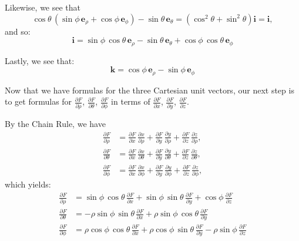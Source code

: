 {Likewise, we see that
\[
 \cos\theta\,(\sin\phi\,\textbf{e}_{\rho} + \cos\phi\,\textbf{e}_{\phi}) - \sin\theta\,\textbf{e}_{\theta} =
  (\cos^2 \theta + \sin^2 \theta)\textbf{i} = \textbf{i} ,
\]
and so:
\begin{equation}\label{i_sphere}
 \textbf{i} = \sin\phi\,\cos\theta\,\textbf{e}_{\rho} - \sin\theta\,\textbf{e}_{\theta} + \cos\phi\,\cos\theta\,\textbf{e}_{\phi}
\end{equation}

Lastly, we see that:
\begin{equation}\label{k_sphere}
 \textbf{k} = \cos\phi\,\textbf{e}_{\rho} - \sin\phi\,\textbf{e}_{\phi}
\end{equation}

Now that we have formulas for the three Cartesian unit vectors, our next step is to get formulas for $\frac{\partial F}{\partial \rho}$, $\frac{\partial F}{\partial \theta}$, $\frac{\partial F}{\partial \phi}$ in terms of $\frac{\partial F}{\partial x}$, $\frac{\partial F}{\partial y}$, $\frac{\partial F}{\partial z}$.

By the Chain Rule, we have
\begin{align*}
 \frac{\partial F}{\partial \rho} &= \frac{\partial F}{\partial x}\,\frac{\partial x}{\partial \rho} +
  \frac{\partial F}{\partial y}\,\frac{\partial y}{\partial \rho} +
  \frac{\partial F}{\partial z}\,\frac{\partial z}{\partial \rho} ,\\
 \frac{\partial F}{\partial \theta} &= \frac{\partial F}{\partial x}\,\frac{\partial x}{\partial \theta} +
  \frac{\partial F}{\partial y}\,\frac{\partial y}{\partial \theta} +
  \frac{\partial F}{\partial z}\,\frac{\partial z}{\partial \theta} ,\\
 \frac{\partial F}{\partial \phi} &= \frac{\partial F}{\partial x}\,\frac{\partial x}{\partial \phi} +
  \frac{\partial F}{\partial y}\,\frac{\partial y}{\partial \phi} +
  \frac{\partial F}{\partial z}\,\frac{\partial z}{\partial \phi} ,
\end{align*}
which yields:
\begin{align}
 \frac{\partial F}{\partial \rho} &= \sin\phi\,\cos\theta\,\frac{\partial F}{\partial x} +
  \sin\phi\,\sin\theta\,\frac{\partial F}{\partial y} + \cos\phi\,\frac{\partial F}{\partial z}\\
 \frac{\partial F}{\partial \theta} &= -\rho\sin\phi\,\sin\theta\,\frac{\partial F}{\partial x} +
  \rho\sin\phi\,\cos\theta\,\frac{\partial F}{\partial y}\\
 \frac{\partial F}{\partial \phi} &= \rho\cos\phi\,\cos\theta\,\frac{\partial F}{\partial x} +
  \rho\cos\phi\,\sin\theta\,\frac{\partial F}{\partial y} - \rho\sin\phi\,\frac{\partial F}{\partial z}
\end{align}

}
